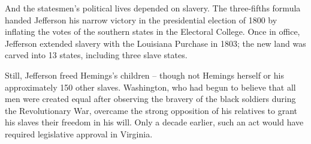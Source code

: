 \documentclass[a4paper]{article}
\begin{document}
\par
And the statesmen’s political lives depended on slavery. The three-fifths formula handed Jefferson his narrow victory in the presidential election of 1800 by inflating the votes of the southern states in the Electoral College. Once in office, Jefferson extended slavery with the Louisiana Purchase in 1803; the new land was carved into 13 states, including three slave states.

\par
Still, Jefferson freed Hemings’s children – though not Hemings herself or his approximately 150 other slaves. Washington, who had begun to believe that all men were created equal after observing the bravery of the black soldiers during the Revolutionary War, overcame the strong opposition of his relatives to grant his slaves their freedom in his will. Only a decade earlier, such an act would have required legislative approval in Virginia.
\end{document}
